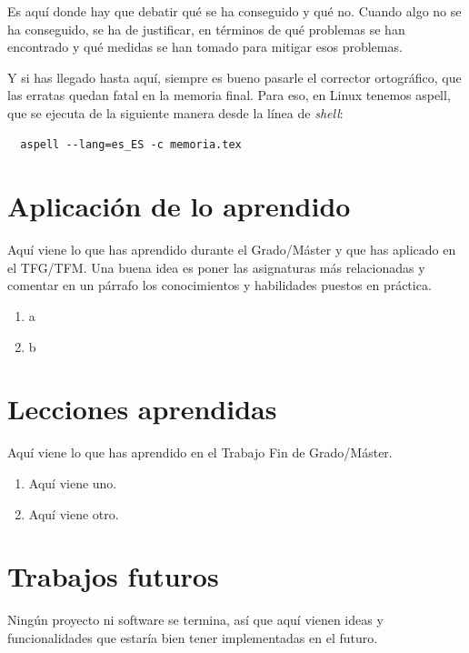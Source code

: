 \documentclass[a4paper, 12pt]{book}
\begin{document}
Es aquí donde hay que debatir qué se ha conseguido y qué no. 
Cuando algo no se ha conseguido, se ha de justificar, en términos de qué problemas se han encontrado y qué medidas se han tomado para mitigar esos problemas.

Y si has llegado hasta aquí, siempre es bueno pasarle el corrector ortográfico, que las erratas quedan fatal en la memoria final.
Para eso, en Linux tenemos aspell, que se ejecuta de la siguiente manera desde la línea de \emph{shell}:

\begin{verbatim}
  aspell --lang=es_ES -c memoria.tex
\end{verbatim}

\section{Aplicación de lo aprendido}
\label{sec:aplicacion}

Aquí viene lo que has aprendido durante el Grado/Máster y que has aplicado en el TFG/TFM. Una buena idea es poner las asignaturas más relacionadas y comentar en un párrafo los conocimientos y habilidades puestos en práctica.

\begin{enumerate}
  \item a
  \item b
\end{enumerate}


\section{Lecciones aprendidas}
\label{sec:lecciones_aprendidas}

Aquí viene lo que has aprendido en el Trabajo Fin de Grado/Máster.

\begin{enumerate}
  \item Aquí viene uno.
  \item Aquí viene otro.
\end{enumerate}


\section{Trabajos futuros}
\label{sec:trabajos_futuros}

Ningún proyecto ni software se termina, así que aquí vienen ideas y funcionalidades que estaría bien tener implementadas en el futuro.
\end{document}

